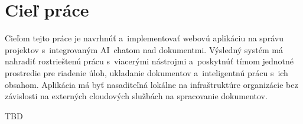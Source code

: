 \chapter{Cieľ práce}

        Cieľom tejto práce je navrhnúť a~implementovať webovú aplikáciu na správu projektov
s~integrovaným AI~chatom nad dokumentmi. Výsledný systém má nahradiť roztrieštenú prácu
s~viacerými nástrojmi a~poskytnúť tímom jednotné prostredie pre riadenie úloh, ukladanie
dokumentov a~inteligentnú prácu s~ich obsahom. Aplikácia má byť nasaditeľná lokálne
na infraštruktúre organizácie bez závislosti na externých cloudových službách na spracovanie
dokumentov.

TBD